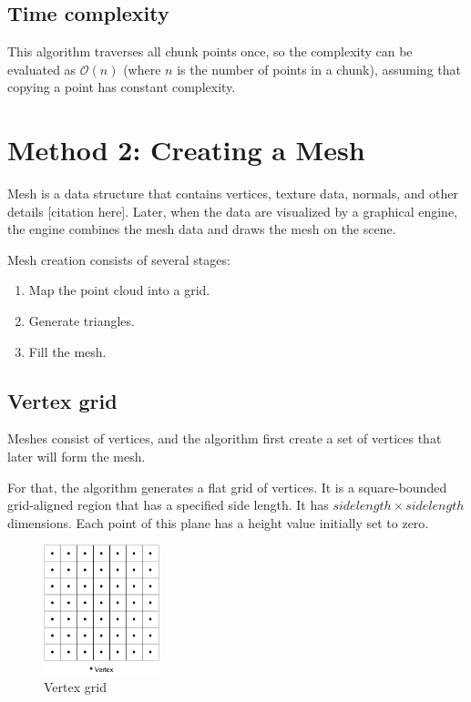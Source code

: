 \subsection{Time complexity}

This algorithm traverses all chunk points once, so the complexity can be evaluated as $\mathcal{O}(n)$ (where $n$ is the number of points in a chunk), assuming that copying a point has constant complexity.


\section{Method 2: Creating a Mesh}
\label{sec:creating_mesh}

Mesh is a data structure that contains vertices, texture data, normals, and other details [citation here]. Later, when the data are visualized by a graphical engine, the engine  combines the mesh data and draws the mesh on the scene.

Mesh creation consists of several stages:

\begin{enumerate}
    \item Map the point cloud into a grid.
    \item Generate triangles.
    \item Fill the mesh.
\end{enumerate}


\subsection{Vertex grid}

Meshes consist of vertices, and the algorithm first create a set of vertices that later will form the mesh.

For that, the algorithm generates a flat grid of vertices. It is a square-bounded grid-aligned region that has a specified side length. It has $side length \times side length$ dimensions. Each point of this plane has a height value initially set to zero.

\begin{figure}[ht]
    \centering
    \includegraphics[width=0.3\textwidth]{vertex-grid.pdf}
    \caption{Vertex grid}
    \label{fig:vertex_grid}
\end{figure}


